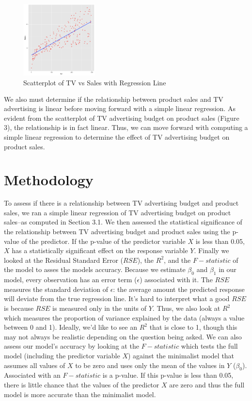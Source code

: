 \documentclass[12pt]{article}\usepackage[]{graphicx}\usepackage[]{color}
\begin{document}
\begin{figure}[h]
\caption{Scatterplot of TV vs Sales with Regression Line}
\centering
\includegraphics[width=0.35\textwidth]{scatterplot-tv-sales.png}
\end{figure}

We also must determine if the relationship between product sales and TV advertising is linear before moving forward with a simple linear regression. As evident from the scatterplot of TV advertising budget on product sales (Figure 3), the relationship is in fact linear. Thus, we can move forward with computing a simple linear regression to determine the effect of TV advertising budget on product sales.


\section{Methodology}

To assess if there is a relationship between TV advertising budget and product sales, we ran a simple linear regression of TV advertising budget on product sales--as computed in Section 3.1. We then assessed the statistical significance of the relationship between TV advertising budget and product sales using the p-value of the predictor. If the p-value of the predictor variable $X$ is less than 0.05, $X$ has a statistically significant effect on the response variable $Y$. Finally we looked at the Residual Standard Error ($RSE$), the $R^2$, and the $F-statistic$ of the model to asses the models accuracy. Because we estimate $\beta_0$ and $\beta_1$ in our model, every observation has an error term ($\epsilon$) associated with it. The $RSE$ measures the standard deviation of $\epsilon$: the average amount the predicted response will deviate from the true regression line. It's hard to interpret what a good $RSE$ is because $RSE$ is measured only in the units of $Y$. Thus, we also look at $R^2$ which measures the proportion of variance explained by the data (always a value between 0 and 1). Ideally, we'd like to see an $R^2$ that is close to 1, though this may not always be realistic depending on the question being asked. We can also assess our model's accuracy by looking at the $F-statistic$ which tests the full model (including the predictor variable $X$) against the minimalist model that assumes all values of $X$ to be zero and uses only the mean of the values in $Y$ ($\beta_0$). Associated with an $F-statistic$ is a p-value. If this p-value is less than 0.05, there is little chance that the values of the predictor $X$ are zero and thus the full model is more accurate than the minimalist model.
\end{document}
